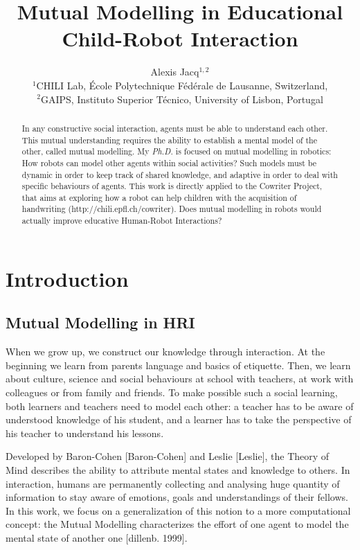 \documentclass[10pt,a4paper,twocolumn]{article}
\begin{document}
\title{Mutual Modelling in Educational Child-Robot Interaction}


\author{Alexis Jacq$^{1,2}$\\
$^1$CHILI Lab, \'Ecole Polytechnique F\'ed\'erale de Lausanne, Switzerland,\\
$^2$GAIPS, Instituto Superior T\'{e}cnico, University of Lisbon, Portugal}




\maketitle
\begin{abstract}
In any constructive social interaction, agents must be able to understand each other. This mutual understanding requires the ability to establish a mental model of the other, called mutual modelling. My \textit{Ph.D.} is focused on mutual modelling in robotics: How robots can model other agents within social activities? Such models must be dynamic in order to keep track of shared knowledge, and adaptive in order to deal with specific behaviours of agents. 
This work is directly applied to the Cowriter Project, that aims at exploring how a robot can help children with the acquisition of handwriting (http://chili.epfl.ch/cowriter). Does mutual modelling in robots would actually improve educative Human-Robot Interactions?
\end{abstract}

\section{Introduction}
\subsection{Mutual Modelling in HRI}

When we grow up, we construct our knowledge through interaction. At the beginning we learn from parents language and basics of etiquette. Then, we learn about culture, science and social behaviours at school with teachers, at work with colleagues or from family and friends. To make possible such a social learning, both learners and teachers need to model each other: a teacher has to be aware of understood knowledge of his student, and a learner has to take the perspective of his teacher to understand his lessons. 

Developed by Baron-Cohen [Baron-Cohen] and Leslie [Leslie], the Theory of Mind describes the ability to attribute mental states and knowledge to others. In interaction, humans are permanently collecting and analysing huge quantity of information to stay aware of emotions, goals and understandings of their fellows. In this work, we focus on a generalization of this notion to a more computational concept: the Mutual Modelling characterizes the effort of one agent to model the mental state of another one [dillenb. 1999]. 
\end{document}
